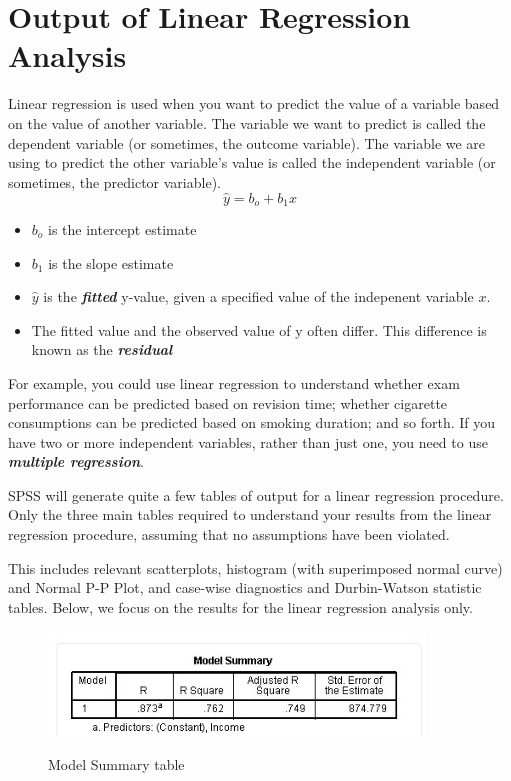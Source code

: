 \documentclass[a4paper,12pt]{article}
\begin{document}
\tableofcontents
\newpage

\section{Output of Linear Regression Analysis}
Linear regression is used when you want to predict the value of a variable based on the value of another variable. The variable we want to predict is called the dependent variable (or sometimes, the outcome variable). The variable we are using to predict the other variable's value is called the independent variable (or sometimes, the predictor variable).
\[ \hat{y} = b_o + b_1 x \]
\begin{itemize}
\item $b_o$ is the intercept estimate
\item $b_1$ is the slope estimate
\item $\hat{y}$ is the \textbf{\textit{fitted}} y-value, given a specified value of the indepenent variable $x$.
\item The fitted value and the observed value of y often differ. This difference is known as the \textbf{\textit{residual}}
\end{itemize}

For example, you could use linear regression to understand whether exam performance can be predicted based on revision time; whether cigarette consumptions can be predicted based on smoking duration; and so forth. If you have two or more independent variables, rather than just one, you need to use \textbf{\textit{multiple regression}}.

SPSS will generate quite a few tables of output for a linear regression procedure. Only the three main tables required to understand your results from the linear regression procedure, assuming that no assumptions have been violated.

This includes relevant scatterplots, histogram (with superimposed normal curve) and Normal P-P Plot, and case-wise diagnostics and Durbin-Watson statistic tables. Below, we focus on the results for the linear regression analysis only.

\begin{figure}[h!]
\begin{centering}
  \includegraphics[width=10cm]{Regre4.jpg}\\
  \caption{Model Summary table}
\end{centering}
\end{figure}
\end{document}
